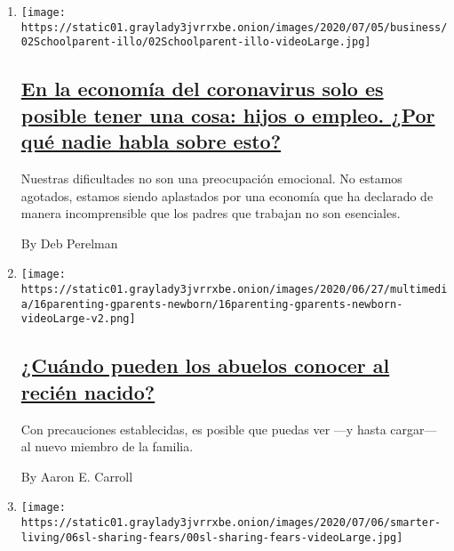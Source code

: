 \begin{enumerate}
\def\labelenumi{\arabic{enumi}.}
\item
  \texttt{[image: https://static01.graylady3jvrrxbe.onion/images/2020/07/05/business/02Schoolparent-illo/02Schoolparent-illo-videoLarge.jpg]}

  \hypertarget{en-la-economuxeda-del-coronavirus-solo-es-posible-tener-una-cosa-hijos-o-empleo-por-quuxe9-nadie-habla-sobre-esto}{%
  \subsection{\texorpdfstring{\href{/es/2020/07/09/espanol/estilos-de-vida/trabajo-hijos-coronavirus.html}{En
  la economía del coronavirus solo es posible tener una cosa: hijos o
  empleo. ¿Por qué nadie habla sobre
  esto?}}{En la economía del coronavirus solo es posible tener una cosa: hijos o empleo. ¿Por qué nadie habla sobre esto?}}\label{en-la-economuxeda-del-coronavirus-solo-es-posible-tener-una-cosa-hijos-o-empleo-por-quuxe9-nadie-habla-sobre-esto}}

  Nuestras dificultades no son una preocupación emocional. No estamos
  agotados, estamos siendo aplastados por una economía que ha declarado
  de manera incomprensible que los padres que trabajan no son
  esenciales.

  By Deb Perelman
\item
  \texttt{[image: https://static01.graylady3jvrrxbe.onion/images/2020/06/27/multimedia/16parenting-gparents-newborn/16parenting-gparents-newborn-videoLarge-v2.png]}

  \hypertarget{cuuxe1ndo-pueden-los-abuelos-conocer-al-reciuxe9n-nacido}{%
  \subsection{\texorpdfstring{\href{/es/2020/06/22/espanol/estilos-de-vida/coronavirus-abuelos-recien-nacidos.html}{¿Cuándo
  pueden los abuelos conocer al recién
  nacido?}}{¿Cuándo pueden los abuelos conocer al recién nacido?}}\label{cuuxe1ndo-pueden-los-abuelos-conocer-al-reciuxe9n-nacido}}

  Con precauciones establecidas, es posible que puedas ver ---y hasta
  cargar--- al nuevo miembro de la familia.

  By Aaron E. Carroll
\item
  \texttt{[image: https://static01.graylady3jvrrxbe.onion/images/2020/07/06/smarter-living/06sl-sharing-fears/00sl-sharing-fears-videoLarge.jpg]}


\end{enumerate}
